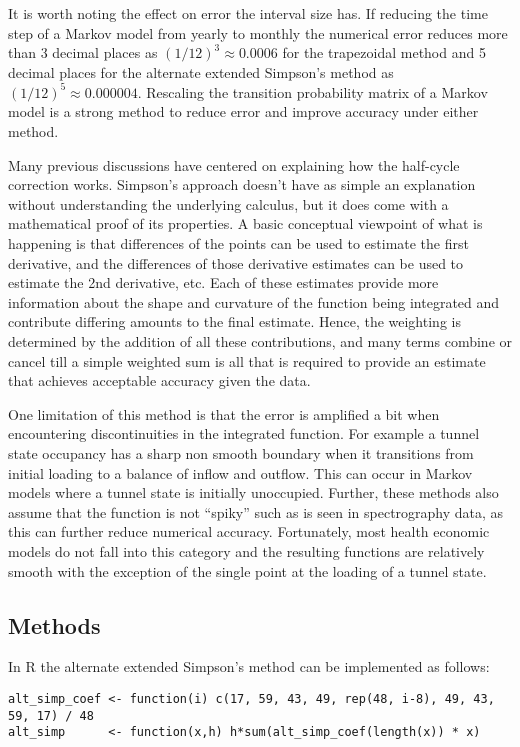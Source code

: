 \documentclass[]{article}
\begin{document}
It is worth noting the effect on error the interval size has. If
reducing the time step of a Markov model from yearly to monthly the numerical error reduces
more than 3 decimal places as
\((1/12)^3 \approx 0.0006\) for the trapezoidal method and 5 decimal
places for the alternate extended Simpson's method as
\((1/12)^5 \approx 0.000004\). Rescaling the transition probability
matrix of a Markov model is a strong method to reduce error and improve
accuracy under either method.

Many previous discussions have centered on explaining how the half-cycle
correction works. Simpson's approach doesn't have as simple an
explanation without understanding the underlying calculus, but it does
come with a mathematical proof of its properties. A basic conceptual
viewpoint of what is happening is that differences of the points can be
used to estimate the first derivative, and the differences of those
derivative estimates can be used to estimate the 2nd derivative, etc.
Each of these estimates provide more information about the shape and
curvature of the function being integrated and contribute differing
amounts to the final estimate. Hence, the weighting is determined by the
addition of all these contributions, and many terms combine or cancel
till a simple weighted sum is all that is required to provide an
estimate that achieves acceptable accuracy given the data.

One limitation of this method is that the error is amplified a bit when
encountering discontinuities in the integrated function. For example a
tunnel state occupancy has a sharp non smooth boundary when it
transitions from initial loading to a balance of inflow and outflow.
This can occur in Markov models where a tunnel state is initially
unoccupied. Further, these methods also assume that the function is not
``spiky'' such as is seen in spectrography data,
as this can further reduce numerical accuracy\cite{kalambet2018}.
Fortunately, most health economic models do not fall into this category
and the resulting functions are relatively smooth with the exception of
the single point at the loading of a tunnel state.


\subsection{Methods}

In R the alternate extended Simpson's method can be implemented as follows:

\begin{verbatim}
alt_simp_coef <- function(i) c(17, 59, 43, 49, rep(48, i-8), 49, 43, 59, 17) / 48
alt_simp      <- function(x,h) h*sum(alt_simp_coef(length(x)) * x)
\end{verbatim}
\end{document}
